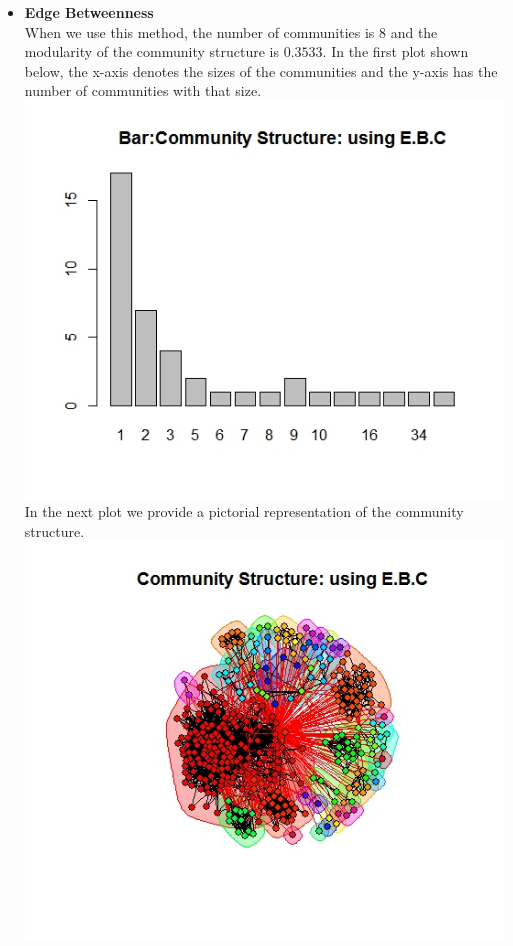 \documentclass{article}
\begin{document}
\begin{itemize}
	\item \textbf{Edge Betweenness}\\
	When we use this method, the number of communities is $8$ and the modularity of the community
	structure is $0.3533$.
	In the first plot shown below, the x-axis denotes the sizes of the communities and the y-axis has the number of communities with that size.\\
	\includegraphics[scale=0.4]{q4d} \\
	In the next plot we provide a pictorial representation of the community structure.\\
	\includegraphics[scale=0.4]{q4e} \\ 

\end{itemize}
\end{document}
